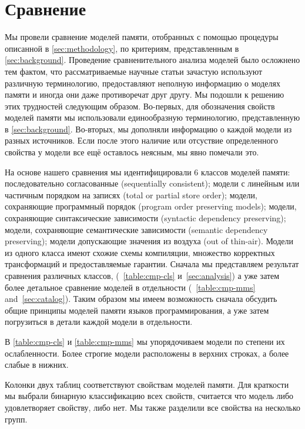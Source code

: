 \section{Сравнение}
\label{sec:comparison}

Мы провели сравнение моделей памяти, 
отобранных с помощью процедуры описанной в \cref{sec:methodology},
по критериям, представленным в \cref{sec:background}. 
Проведение сравненительного анализа моделей было 
осложнено тем фактом, что рассматриваемые 
научные статьи зачастую используют различную терминологию, 
предоставляют неполную информацию о моделях памяти 
и иногда они даже противоречат друг другу. 
Мы подошли к решению этих трудностей следующим образом. 
Во-первых, для обозначения свойств моделей памяти
мы использовали единообразную терминологию,
представленную в \cref{sec:background}.
Во-вторых, мы дополняли информацию о каждой модели 
из разных источников. Если после этого 
наличие или отсуствие определенного свойства у модели 
все ещё оставлось неясным, мы явно помечали это. 

На основе нашего сравнения мы идентифицировали 6 классов моделей памяти:
последовательно согласованные (sequentially consistent); 
модели с линейным или частичным порядком на записях
(total or partial store order);
модели, сохраняющие программный порядок
(program order preserving models); 
модели, сохраняющие синтаксические зависимости 
(syntactic dependency preserving);
модели, сохраняющие семантические зависимости
(semantic dependency preserving);
модели допускающие значения из воздуха
(out of thin-air). 
Модели из одного класса имеют схожие схемы компиляции, 
множество корректных трансформаций и предоставляемые гарантии. 
Сначала мы представляем результат сравнения различных классов, 
(\see~\cref{table:cmp-cls} и~\cref{sec:analysis})
а уже затем более детальное сравнение моделей в отдельности
(\see~\cref{table:cmp-mms} and~\cref{sec:catalog}).
Таким образом мы имеем возможность сначала обсудить общие 
принципы моделей памяти языков программирования, 
а уже затем погрузиться в детали каждой модели в отдельности. 



В \cref{table:cmp-cls} и \cref{table:cmp-mms} 
мы упорядочиваем модели по степени их ослабленности. 
Более строгие модели расположены в верхних строках, 
а более слабые в нижних.  

Колонки двух таблиц соответствуют свойствам моделей памяти.
Для краткости мы выбрали бинарную классификацию всех свойств,
\ie считается что модель либо удовлетворяет свойству, либо нет. 
Мы также разделили все свойства на несколько групп. 

